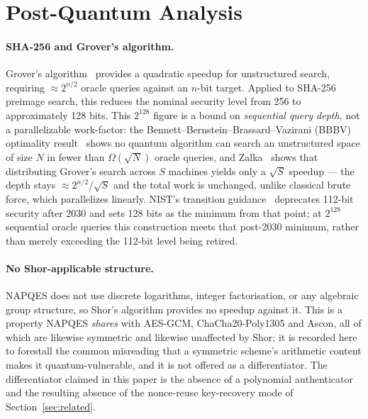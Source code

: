 \documentclass[11pt,a4paper]{article}
\begin{document}
\section{Post-Quantum Analysis}
\label{sec:pq}

\paragraph{SHA-256 and Grover's algorithm.}
Grover's algorithm~\cite{grover96} provides a quadratic speedup for
unstructured search, requiring $\approx2^{n/2}$ oracle queries against an
$n$-bit target. Applied to SHA-256 preimage search, this reduces the
nominal security level from 256 to approximately 128 bits. This $2^{128}$
figure is a bound on \emph{sequential query depth}, not a parallelizable
work-factor: the Bennett–Bernstein–Brassard–Vazirani (BBBV) optimality
result~\cite{bbbv1997} shows no quantum algorithm can search an
unstructured space of size $N$ in fewer than $\Omega(\sqrt N)$ oracle
queries, and Zalka~\cite{zalka1999} shows that distributing Grover's
search across $S$ machines yields only a $\sqrt{S}$ speedup — the depth
stays $\approx2^{n/2}/\sqrt{S}$ and the total work is unchanged, unlike
classical brute force, which parallelizes linearly. NIST's transition
guidance~\cite{sp800-131a} deprecates 112-bit security after 2030 and sets
128 bits as the minimum from that point; at $2^{128}$ sequential oracle
queries this construction meets that post-2030 minimum, rather than merely
exceeding the 112-bit level being retired.

\paragraph{No Shor-applicable structure.}
NAPQES does not use discrete logarithms, integer factorisation, or any
algebraic group structure, so Shor's algorithm provides no speedup against
it. This is a property NAPQES \emph{shares} with AES-GCM,
ChaCha20-Poly1305 and Ascon, all of which are likewise symmetric and
likewise unaffected by Shor; it is recorded here to forestall the common
misreading that a symmetric scheme's arithmetic content makes it
quantum-vulnerable, and it is not offered as a differentiator. The
differentiator claimed in this paper is the absence of a polynomial
authenticator and the resulting absence of the nonce-reuse key-recovery
mode of Section~\ref{sec:related}.
\end{document}
